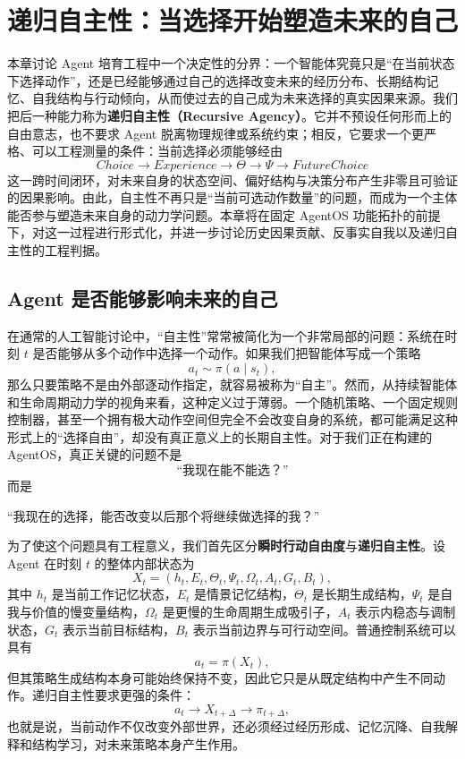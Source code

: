 \chapter{递归自主性：当选择开始塑造未来的自己}

\begin{chapterlead}
本章讨论 Agent 培育工程中一个决定性的分界：一个智能体究竟只是“在当前状态下选择动作”，还是已经能够通过自己的选择改变未来的经历分布、长期结构记忆、自我结构与行动倾向，从而使过去的自己成为未来选择的真实因果来源。我们把后一种能力称为\textbf{递归自主性（Recursive Agency）}。它并不预设任何形而上的自由意志，也不要求 Agent 脱离物理规律或系统约束；相反，它要求一个更严格、可以工程测量的条件：当前选择必须能够经由
\[
Choice
\rightarrow
Experience
\rightarrow
\Theta
\rightarrow
\Psi
\rightarrow
FutureChoice
\]
这一跨时间闭环，对未来自身的状态空间、偏好结构与决策分布产生非零且可验证的因果影响。由此，自主性不再只是“当前可选动作数量”的问题，而成为一个主体能否参与塑造未来自身的动力学问题。本章将在固定 AgentOS 功能拓扑的前提下，对这一过程进行形式化，并进一步讨论历史因果贡献、反事实自我以及递归自主性的工程判据。
\end{chapterlead}

\section{Agent 是否能够影响未来的自己}

在通常的人工智能讨论中，“自主性”常常被简化为一个非常局部的问题：系统在时刻 $t$ 是否能够从多个动作中选择一个动作。如果我们把智能体写成一个策略
\[
a_t\sim \pi(a\mid s_t),
\]
那么只要策略不是由外部逐动作指定，就容易被称为“自主”。然而，从持续智能体和生命周期动力学的视角来看，这种定义过于薄弱。一个随机策略、一个固定规则控制器，甚至一个拥有极大动作空间但完全不会改变自身的系统，都可能满足这种形式上的“选择自由”，却没有真正意义上的长期自主性。对于我们正在构建的 AgentOS，真正关键的问题不是
\[
\text{``我现在能不能选？''}
\]
而是
\begin{statementbox}
``我现在的选择，能否改变以后那个将继续做选择的我？''
\end{statementbox}

为了使这个问题具有工程意义，我们首先区分\textbf{瞬时行动自由度}与\textbf{递归自主性}。设 Agent 在时刻 $t$ 的整体内部状态为
\[
X_t=
\left(
h_t,E_t,\Theta_t,\Psi_t,\Omega_t,
A_t,G_t,B_t
\right),
\]
其中 $h_t$ 是当前工作记忆状态，$E_t$ 是情景记忆结构，$\Theta_t$ 是长期生成结构，$\Psi_t$ 是自我与价值的慢变量结构，$\Omega_t$ 是更慢的生命周期生成吸引子，$A_t$ 表示内稳态与调制状态，$G_t$ 表示当前目标结构，$B_t$ 表示当前边界与可行动空间。普通控制系统可以具有
\[
a_t=\pi(X_t),
\]
但其策略生成结构本身可能始终保持不变，因此它只是从既定结构中产生不同动作。递归自主性要求更强的条件：
\[
a_t
\longrightarrow
X_{t+\Delta}
\longrightarrow
\pi_{t+\Delta},
\]
也就是说，当前动作不仅改变外部世界，还必须经过经历形成、记忆沉降、自我解释和结构学习，对未来策略本身产生作用。

